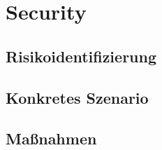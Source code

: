 \section{Security}

\subsection{Risikoidentifizierung}
\subsection{Konkretes Szenario}
\subsection{Maßnahmen}